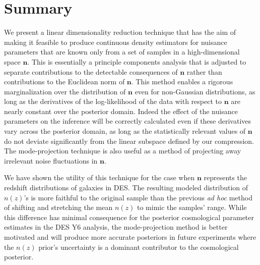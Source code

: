 \documentclass[linenumbers, onecolumn]{aastex7}
\newcommand{\vecn}{\ensuremath{\mathbf{n}}}
\begin{document}
\section{Summary}
  We present a linear dimensionality reduction technique that has the
  aim of making it feasible to produce continuous density estimators
  for nuisance parameters that are known only from a set of samples in
  a high-dimensional space $\vecn.$  This is essentially a principle
  components analysis that is adjusted to separate contributions to
  the detectable consequences of $\vecn$ rather than contributions to
  the Euclidean norm of $\vecn.$   This method enables a rigorous
  marginalization over the distribution of $\vecn$ even for
  non-Gaussian distributions, as long as the derivatives of the
  log-likelihood of the data with respect to $\vecn$ are nearly
  constant over the posterior domain.  Indeed the effect of the
  nuisance parameters on the inference will be correctly calculated
  even if these derivatives vary across the posterior domain, as long
  as the statistically relevant values of $\vecn$ do not deviate
  significantly from the linear subspace defined by our compression.
The mode-projection technique
  is also useful as a method of projecting away irrelevant
  noise fluctuations in $\vecn.$

  We have shown the utility of this technique for the case when
  $\vecn$ represents the redshift distributions of galaxies in DES.
  The resulting modeled distribution of $n(z)$'s is more faithful to
  the original sample than the previous \textit{ad hoc} method of
  shifting and stretching the mean $n(z)$ to mimic the samples'
  range.  While this difference has minimal consequence for the
  posterior cosmological parameter estimates in the DES Y6 analysis,
  the mode-projection method is better motivated and will produce more
  accurate posteriors in future experiments where the $n(z)$
  prior's uncertainty is a dominant contributor to the cosmological posterior.
\end{document}

